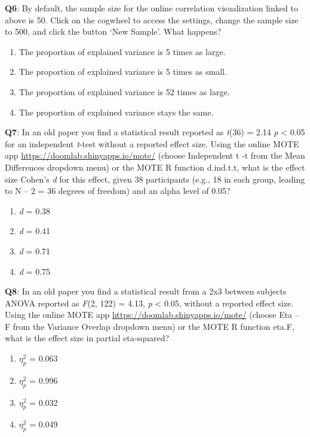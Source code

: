 \documentclass[
  oneside]{book}
\providecommand{\tightlist}{%
  \setlength{\itemsep}{0pt}\setlength{\parskip}{0pt}}
\begin{document}
\textbf{Q6}: By default, the sample size for the online correlation visualization linked to above is 50. Click on the cogwheel to access the settings, change the sample size to 500, and click the button `New Sample'. What happens?

\begin{enumerate}
\def\labelenumi{\Alph{enumi})}
\tightlist
\item
  The proportion of explained variance is 5 times as large.
\item
  The proportion of explained variance is 5 times as small.
\item
  The proportion of explained variance is 52 times as large.
\item
  The proportion of explained variance stays the same.
\end{enumerate}

\textbf{Q7}: In an old paper you find a statistical result reported as \emph{t}(36) = 2.14 \emph{p} \textless{} 0.05 for an independent \emph{t}-test without a reported effect size. Using the online MOTE app \url{https://doomlab.shinyapps.io/mote/} (choose Independent t -t from the Mean Differences dropdown menu) or the MOTE R function d.ind.t.t, what is the effect size Cohen's \emph{d} for this effect, given 38 participants (e.g., 18 in each group, leading to N -- 2 = 36 degrees of freedom) and an alpha level of 0.05?

\begin{enumerate}
\def\labelenumi{\Alph{enumi})}
\tightlist
\item
  \emph{d} = 0.38
\item
  \emph{d} = 0.41
\item
  \emph{d} = 0.71
\item
  \emph{d} = 0.75
\end{enumerate}

\textbf{Q8}: In an old paper you find a statistical result from a 2x3 between subjects ANOVA reported as \emph{F}(2, 122) = 4.13, \emph{p} \textless{} 0.05, without a reported effect size. Using the online MOTE app \url{https://doomlab.shinyapps.io/mote/} (choose Eta -- F from the Variance Overlap dropdown menu) or the MOTE R function eta.F, what is the effect size in partial eta-squared?

\begin{enumerate}
\def\labelenumi{\Alph{enumi})}
\tightlist
\item
  \(\eta_p^2\) = 0.063
\item
  \(\eta_p^2\) = 0.996
\item
  \(\eta_p^2\) = 0.032
\item
  \(\eta_p^2\) = 0.049
\end{enumerate}
\end{document}
